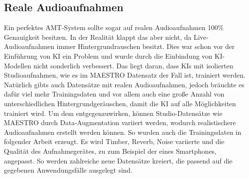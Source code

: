 \subsection{Reale Audioaufnahmen}
Ein perfektes AMT-System sollte sogar auf realen Audioaufnahmen 100\% Genauigkeit besitzen.
In der Realität klappt das aber nicht, da Live-Audioaufnahmen immer Hintergrundrauschen besitzt.
Dies war schon vor der Einführung von KI ein Problem und wurde durch die Einbindung
von KI-Modellen nicht sonderlich verbessert.
Das liegt daran, dass KIs mit isolierten Studioaufnahmen, wie es im MAESTRO Datensatz der Fall ist, trainiert werden.
Natürlich gibts auch Datensätze mit realen Audioaufnahmen, jedoch bräuchte es dafür viel mehr Trainingsdaten und
vor allem auch eine große Anzahl von unterschiedlichen Hintergrundgeräuschen,
damit die KI auf alle Möglichkeiten trainiert wird.
Um dem entgegenzuwirken, können Studio-Datensätze wie MAESTRO durch Data-Augmentation variiert werden,
wodurch realistischere Audioaufnahmen erstellt werden können.
So wurden auch die Trainingsdaten in folgender Arbeit erzeugt.
\cite{kusaka2024mobile}
Es wird Timber, Reverb, Noise variierte und die Qualität des Aufnahmegerätes, zu zum Beispiel der eines Smartphones, angepasst.
So werden zahlreiche neue Datensätze kreiert, die passend auf die gegebenen Anwendungsfälle ausgelegt sind.

